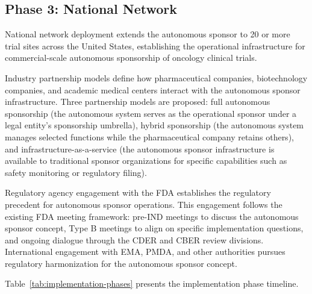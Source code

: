 \subsection{Phase 3: National Network}

National network deployment extends the autonomous sponsor to 20 or more trial sites
across the United States, establishing the operational infrastructure for commercial-scale
autonomous sponsorship of oncology clinical trials.

Industry partnership models define how pharmaceutical companies, biotechnology companies,
and academic medical centers interact with the autonomous sponsor infrastructure. Three
partnership models are proposed: full autonomous sponsorship (the autonomous system
serves as the operational sponsor under a legal entity's sponsorship umbrella), hybrid
sponsorship (the autonomous system manages selected functions while the pharmaceutical
company retains others), and infrastructure-as-a-service (the autonomous sponsor
infrastructure is available to traditional sponsor organizations for specific capabilities
such as safety monitoring or regulatory filing).

Regulatory agency engagement with the FDA establishes the regulatory precedent for
autonomous sponsor operations. This engagement follows the existing FDA meeting framework:
pre-IND meetings to discuss the autonomous sponsor concept, Type B meetings to align on
specific implementation questions, and ongoing dialogue through the CDER and CBER review
divisions. International engagement with EMA, PMDA, and other authorities pursues
regulatory harmonization for the autonomous sponsor concept.

Table~\ref{tab:implementation-phases} presents the implementation phase timeline.


